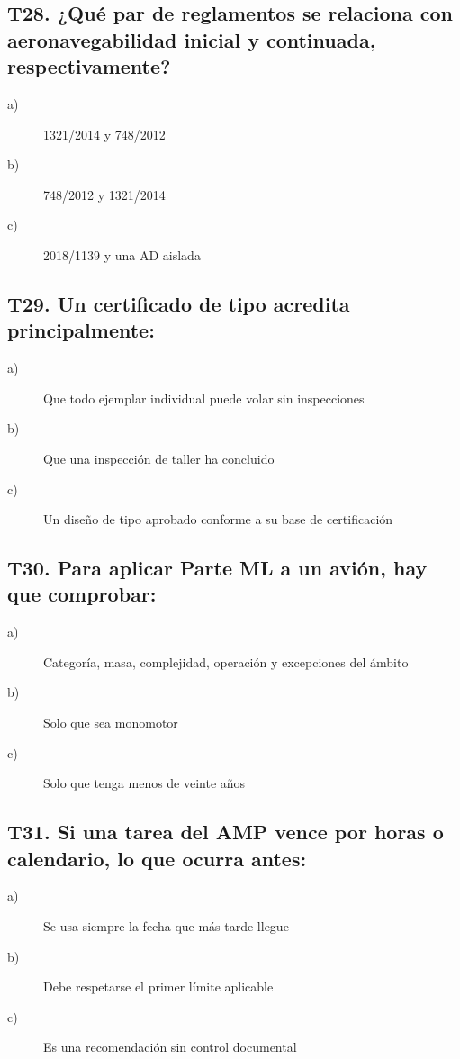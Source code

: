 \subsection*{T28. ¿Qué par de reglamentos se relaciona con aeronavegabilidad inicial y continuada, respectivamente?}
\begin{description}
\item[a)] 1321/2014 y 748/2012
\item[b)] 748/2012 y 1321/2014
\item[c)] 2018/1139 y una AD aislada
\end{description}

\subsection*{T29. Un certificado de tipo acredita principalmente:}
\begin{description}
\item[a)] Que todo ejemplar individual puede volar sin inspecciones
\item[b)] Que una inspección de taller ha concluido
\item[c)] Un diseño de tipo aprobado conforme a su base de certificación
\end{description}

\subsection*{T30. Para aplicar Parte ML a un avión, hay que comprobar:}
\begin{description}
\item[a)] Categoría, masa, complejidad, operación y excepciones del ámbito
\item[b)] Solo que sea monomotor
\item[c)] Solo que tenga menos de veinte años
\end{description}

\subsection*{T31. Si una tarea del AMP vence por horas o calendario, lo que ocurra antes:}
\begin{description}
\item[a)] Se usa siempre la fecha que más tarde llegue
\item[b)] Debe respetarse el primer límite aplicable
\item[c)] Es una recomendación sin control documental
\end{description}

